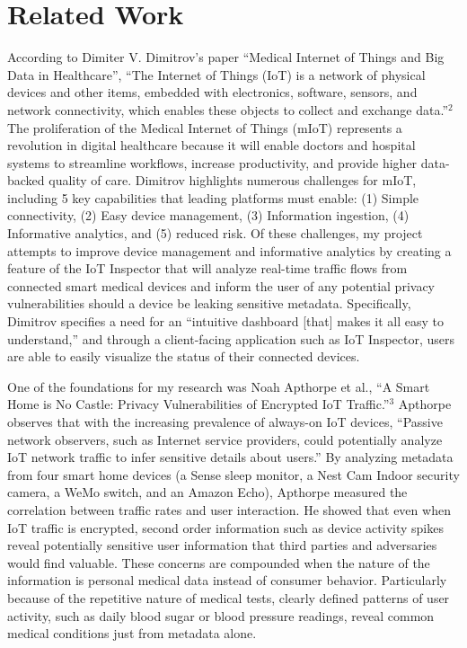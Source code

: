 
\section{Related Work}

According to Dimiter V. Dimitrov's paper ``Medical Internet of Things and Big Data in Healthcare'', ``The Internet of Things (IoT) is a network of physical devices and other items, embedded with electronics, software, sensors, and network connectivity, which enables these objects to collect and exchange data.''$^2$ The proliferation of the Medical Internet of Things (mIoT) represents a revolution in digital healthcare because it will enable doctors and hospital systems to streamline workflows, increase productivity, and provide higher data-backed quality of care. Dimitrov highlights numerous challenges for mIoT, including 5 key capabilities that leading platforms must enable: (1) Simple connectivity, (2) Easy device management, (3) Information ingestion, (4) Informative analytics, and (5) reduced risk. Of these challenges, my project attempts to improve device management and informative analytics by creating a feature of the IoT Inspector that will analyze real-time traffic flows from connected smart medical devices and inform the user of any potential privacy vulnerabilities should a device be leaking sensitive metadata. Specifically, Dimitrov specifies a need for an ``intuitive dashboard [that] makes it all easy to understand,'' and through a client-facing application such as IoT Inspector, users are able to easily visualize the status of their connected devices. 

One of the foundations for my research was Noah Apthorpe et al., ``A Smart Home is No Castle: Privacy Vulnerabilities of Encrypted IoT Traffic.''$^3$ Apthorpe observes that with the increasing prevalence of always-on IoT devices, ``Passive network observers, such as Internet service providers, could potentially analyze IoT network traffic to infer sensitive details about users.'' By analyzing metadata from four smart home devices (a Sense sleep monitor, a Nest Cam Indoor security camera, a WeMo switch, and an Amazon Echo), Apthorpe measured the correlation between traffic rates and user interaction. He showed that even when IoT traffic is encrypted, second order information such as device activity spikes reveal potentially sensitive user information that third parties and adversaries would find valuable. These concerns are compounded when the nature of the information is personal medical data instead of consumer behavior. Particularly because of the repetitive nature of medical tests, clearly defined patterns of user activity, such as daily blood sugar or blood pressure readings, reveal common medical conditions just from metadata alone. 

